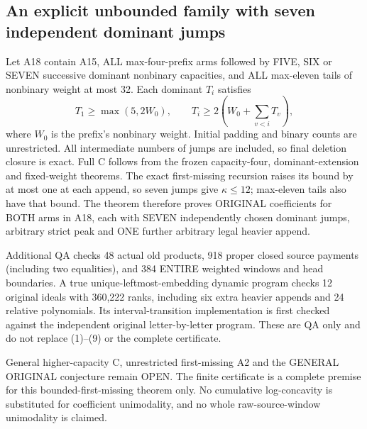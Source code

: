 \subsection{An explicit unbounded family with seven independent dominant jumps}
Let A18 contain A15, ALL max-four-prefix arms followed by FIVE, SIX or
SEVEN successive dominant nonbinary capacities, and ALL max-eleven tails
of nonbinary weight at most 32. Each dominant $T_i$ satisfies
\[
 T_1\ge\max(5,2W_0),\qquad
 T_i\ge2\left(W_0+\sum_{v<i}T_v\right),
\]
where $W_0$ is the prefix's nonbinary weight. Initial padding and binary
counts are unrestricted. All intermediate numbers of jumps are included,
so final deletion closure is exact. Full C follows from the frozen
capacity-four, dominant-extension and fixed-weight theorems. The exact
first-missing recursion raises its bound by at most one at each append,
so seven jumps give $\kappa\le12$; max-eleven tails also have that bound.
The theorem therefore proves ORIGINAL coefficients for BOTH arms in
A18, each with SEVEN independently chosen dominant jumps, arbitrary
strict peak and ONE further arbitrary legal heavier append.

Additional QA checks 48 actual old products, 918 proper closed source
payments (including two equalities), and 384 ENTIRE weighted windows and
head boundaries. A true unique-leftmost-embedding dynamic program checks
12 original ideals with 360,222 ranks, including six extra heavier appends
and 24 relative polynomials. Its interval-transition implementation is
first checked against the independent original letter-by-letter program.
These are QA only and do not replace (1)--(9) or the complete certificate.

General higher-capacity C, unrestricted first-missing A2 and the GENERAL
ORIGINAL conjecture remain OPEN. The finite certificate is a complete
premise for this bounded-first-missing theorem only. No cumulative
log-concavity is substituted for coefficient unimodality, and no whole
raw-source-window unimodality is claimed.

